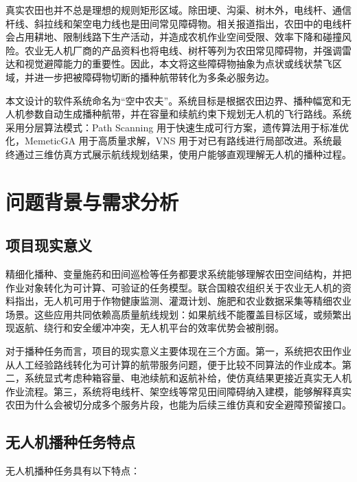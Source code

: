 \documentclass[UTF8,a4paper,12pt]{ctexart}
\begin{document}
真实农田也并不总是理想的规则矩形区域。除田埂、沟渠、树木外，电线杆、通信杆线、斜拉线和架空电力线也是田间常见障碍物。相关报道指出，农田中的电线杆会占用耕地、限制线路下生产活动，并造成农机作业空间受限、效率下降和碰撞风险\cite{china2023pole}。农业无人机厂商的产品资料也将电线、树杆等列为农田常见障碍物，并强调雷达和视觉避障能力的重要性\cite{dji2018mg1p}。因此，本文将这些障碍物抽象为点状或线状禁飞区域，并进一步把被障碍物切断的播种航带转化为多条必服务边。

本文设计的软件系统命名为“空中农夫”。系统目标是根据农田边界、播种幅宽和无人机参数自动生成播种航带，并在容量和续航约束下规划无人机的飞行路线。系统采用分层算法模式：Path Scanning 用于快速生成可行方案，遗传算法用于标准优化，MemeticGA 用于高质量求解，VNS 用于对已有路线进行局部改进。系统最终通过三维仿真方式展示航线规划结果，使用户能够直观理解无人机的播种过程。

\section{问题背景与需求分析}

\subsection{项目现实意义}

精细化播种、变量施药和田间巡检等任务都要求系统能够理解农田空间结构，并把作业对象转化为可计算、可验证的任务模型。联合国粮农组织关于农业无人机的资料指出，无人机可用于作物健康监测、灌溉计划、施肥和农业数据采集等精细农业场景\cite{fao2024drones}。这些应用共同依赖高质量航线规划：如果航线不能覆盖目标区域，或频繁出现返航、绕行和安全缓冲冲突，无人机平台的效率优势会被削弱。

对于播种任务而言，项目的现实意义主要体现在三个方面。第一，系统把农田作业从人工经验路线转化为可计算的航带服务问题，便于比较不同算法的作业成本。第二，系统显式考虑种箱容量、电池续航和返航补给，使仿真结果更接近真实无人机作业流程。第三，系统将电线杆、架空线等常见田间障碍纳入建模，能够解释真实农田为什么会被切分成多个服务片段，也能为后续三维仿真和安全避障预留接口。

\subsection{无人机播种任务特点}

无人机播种任务具有以下特点：
\end{document}
